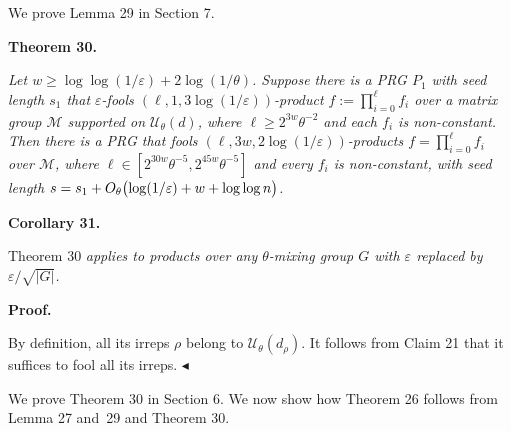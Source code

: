 \documentclass[10pt,a4paper]{article}
\begin{document}



We prove Lemma 29 in Section 7.\par





\par\medskip\noindent\textbf{
\textbf{Theorem 30}\textbf{.}
}\par



\emph{Let $w\geq\log\log(1/\varepsilon)+2\log(1/\theta)$.
Suppose there is a PRG $P_{1}$ with seed length $s_{1}$ that $\varepsilon$-fools $(\ell,1,3\log(1/\varepsilon))$-product $f:=\prod_{i=0}^{\ell}f_{i}$ over a matrix group $\mathcal{M}$ supported on $\mathcal{U}_{\theta}(d)$, where $\ell\geq 2^{3w}\theta^{-2}$ and each $f_{i}$ is non-constant.
Then there is a PRG that fools $(\ell,3w,2\log(1/\varepsilon))$-products $f=\prod_{i=0}^{\ell}f_{i}$ over $\mathcal{M}$, where $\ell\in[2^{30w}\theta^{-5},2^{45w}\theta^{-5}]$ and every $f_{i}$ is non-constant, with seed length $s=s_{1}+O_{\theta}\bigl{(}\log(1/\varepsilon)+w+\log\log n\bigr{)}$.}\par







\par\medskip\noindent\textbf{
\textbf{Corollary 31}\textbf{.}
}\par



Theorem 30\emph{ applies to products over any $\theta$-mixing group $G$ with $\varepsilon$ replaced by $\varepsilon/\sqrt{\lvert G\rvert}$.}\par






\par\medskip\noindent\textbf{Proof.}\par




By definition, all its irreps $\rho$ belong to $\mathcal{U}_{\theta}(d_{\rho})$.
It follows from Claim 21 that it suffices to fool all its irreps.
$\blacktriangleleft$\par




We prove Theorem 30 in Section 6.
We now show how Theorem 26 follows from Lemma 27 and 29 and Theorem 30.\par
\end{document}
